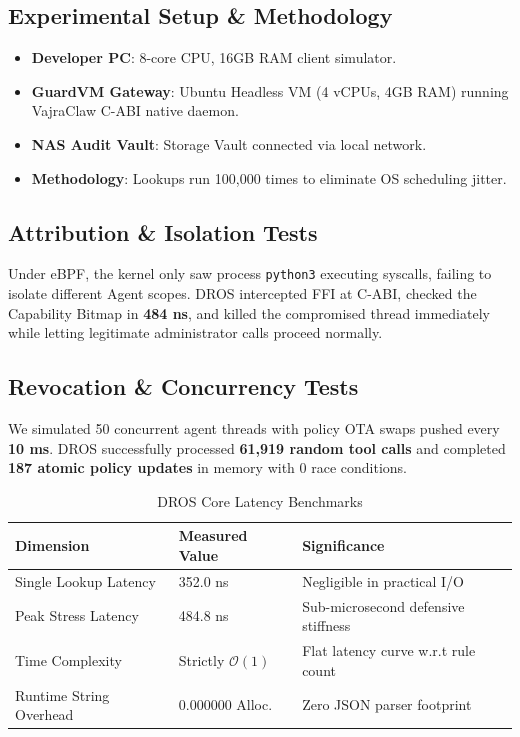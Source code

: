 \documentclass[conference]{IEEEtran}
\begin{document}
\subsection{Experimental Setup \& Methodology}
\begin{itemize}
\item \textbf{Developer PC}: 8-core CPU, 16GB RAM client simulator.
\item \textbf{GuardVM Gateway}: Ubuntu Headless VM (4 vCPUs, 4GB RAM) running VajraClaw C-ABI native daemon.
\item \textbf{NAS Audit Vault}: Storage Vault connected via local network.
\item \textbf{Methodology}: Lookups run 100,000 times to eliminate OS scheduling jitter.
\end{itemize}

\subsection{Attribution \& Isolation Tests}
Under eBPF, the kernel only saw process \texttt{python3} executing syscalls, failing to isolate different Agent scopes. DROS intercepted FFI at C-ABI, checked the Capability Bitmap in \textbf{484 ns}, and killed the compromised thread immediately while letting legitimate administrator calls proceed normally.

\subsection{Revocation \& Concurrency Tests}
We simulated 50 concurrent agent threads with policy OTA swaps pushed every \textbf{10 ms}. DROS successfully processed \textbf{61,919 random tool calls} and completed \textbf{187 atomic policy updates} in memory with 0 race conditions.

\begin{table}[htbp]
\caption{DROS Core Latency Benchmarks}
\centering
\begin{tabular}{lll}
\toprule
Dimension & Measured Value & Significance \\
\midrule
Single Lookup Latency & 352.0 ns & Negligible in practical I/O \\
Peak Stress Latency & 484.8 ns & Sub-microsecond defensive stiffness \\
Time Complexity & Strictly $\mathcal{O}(1)$ & Flat latency curve w.r.t rule count \\
Runtime String Overhead & 0.000000 Alloc. & Zero JSON parser footprint \\
\bottomrule
\end{tabular}
\label{tab:perf}
\end{table}
\end{document}
